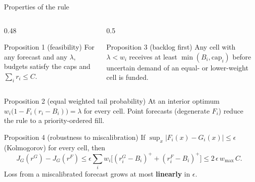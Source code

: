 \documentclass[aspectratio=169,11pt,xcolor=table]{beamer}
\begin{document}
\begin{frame}{Properties of the rule}
  \footnotesize
  \begin{columns}[T]
    \begin{column}{0.48\textwidth}
      \begin{block}{Proposition 1 (feasibility)}
        For any forecast and any $\lambda$, budgets satisfy the caps and $\sum_i r_i \le C$.
      \end{block}
    \end{column}
    \begin{column}{0.5\textwidth}
      \begin{block}{Proposition 3 (backlog first)}
        Any cell with $\lambda < w_i$ receives at least $\min(B_i,\mathrm{cap}_i)$ before uncertain demand of an equal- or lower-weight cell is funded.
      \end{block}
    \end{column}
  \end{columns}
  \begin{block}{Proposition 2 (equal weighted tail probability)}
    At an interior optimum $w_i\big(1 - F_i(r_i - B_i)\big) = \lambda$ for every cell. Point forecasts (degenerate $F_i$) reduce the rule to a priority-ordered fill.
  \end{block}
  \begin{block}{Proposition 4 (robustness to miscalibration)}
    If $\sup_x |F_i(x) - G_i(x)| \le \epsilon$ (Kolmogorov) for every cell, then
    \[
      J_G(r^G) - J_G(r^F) \le \epsilon\sum_i w_i\big[(r_i^G - B_i)^+ + (r_i^F - B_i)^+\big] \le 2\,\epsilon\, w_{\max}\, C.
    \]
    Loss from a miscalibrated forecast grows at most \textbf{linearly} in $\epsilon$.
  \end{block}
\end{frame}
\end{document}
